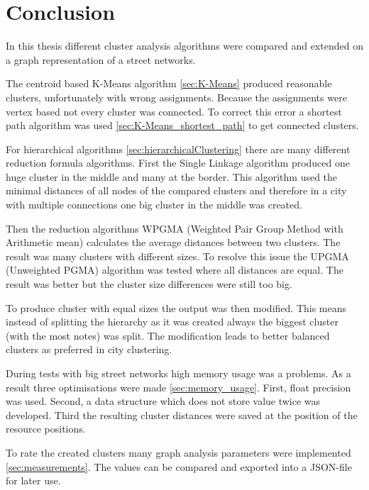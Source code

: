 \chapter{Conclusion}
In this thesis different cluster analysis algorithms were compared and extended on a graph representation of a street networks.

The centroid based K-Means algorithm \ref{sec:K-Means} produced reasonable clusters, unfortunately with wrong assignments. Because the assignments were vertex based not every cluster was connected. To correct this error a shortest path algorithm was used \ref{sec:K-Means_shortest_path} to get connected clusters.

For hierarchical algorithms \ref{sec:hierarchicalClustering} there are many different reduction formula algorithms. First the Single Linkage algorithm produced one huge cluster in the middle and many at the border. This algorithm used the minimal distances of all nodes of the compared clusters and therefore in a city with multiple connections one big cluster in the middle was created.

Then the reduction algorithms WPGMA (Weighted Pair Group Method with Arithmetic mean) calculates the average distances between two clusters. The result was many clusters with different sizes. To resolve this issue the UPGMA (Unweighted PGMA) algorithm was tested where all distances are equal. The result was better but the cluster size differences were still too big.

To produce cluster with equal sizes the output was then modified. This means instead of splitting the hierarchy as it was created always the biggest cluster (with the most notes) was split. The modification leads to better balanced clusters as preferred in city clustering.

During tests with big street networks high memory usage was a problems. As a result three optimisations were made \ref{sec:memory_usage}. First, float precision was used. Second, a data structure which does not store value twice was developed. Third the resulting cluster distances were saved at the position of the resource positions.

To rate the created clusters many graph analysis parameters were implemented \ref{sec:measurements}. The values can be compared and exported into a JSON-file for later use.